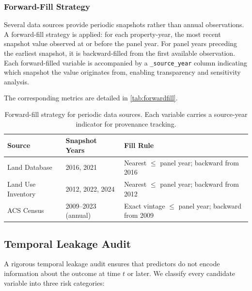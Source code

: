 \subsubsection{Forward-Fill Strategy}
\label{sec:forwardfill}

Several data sources provide periodic snapshots rather than annual observations.
A forward-fill strategy is applied: for each property-year, the most recent
snapshot value observed at or before the panel year. For panel years preceding the
earliest snapshot, it is backward-filled from the first available observation.
Each forward-filled variable is accompanied by a \texttt{\_source\_year} column
indicating which snapshot the value originates from, enabling transparency and
sensitivity analysis.



The corresponding metrics are detailed in \autoref{tab:forwardfill}.

\begin{table}[h]
\centering
\small
\begin{tabular}{lll}
\hline
\textbf{Source} & \textbf{Snapshot Years} & \textbf{Fill Rule} \\
\hline
Land Database & 2016, 2021 & Nearest $\leq$ panel year; backward from 2016 \\
Land Use Inventory & 2012, 2022, 2024 & Nearest $\leq$ panel year; backward from 2012 \\
ACS Census & 2009--2023 (annual) & Exact vintage $\leq$ panel year; backward from 2009 \\
\hline
\end{tabular}
\caption{Forward-fill strategy for periodic data sources. Each variable carries
a source-year indicator for provenance tracking.}
\label{tab:forwardfill}
\end{table}

\subsection{Temporal Leakage Audit}
\label{sec:leakage}

A rigorous temporal leakage audit ensures that predictors do not encode
information about the outcome at time $t$ or later.
We classify every candidate variable into three risk categories:

